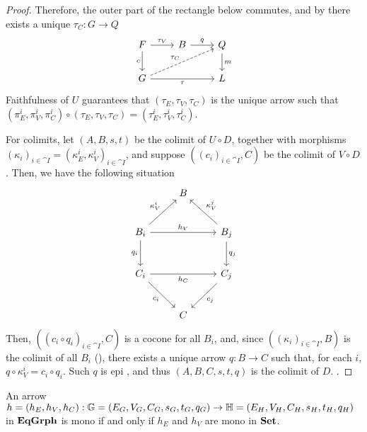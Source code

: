 \begin{proof}
	Therefore, the outer part of the rectangle below commutes, and by  there exists a unique $\tau_C: G \to Q$
    \[
        \begin{tikzcd}
            F \arrow[r, "{\tau_V}"] \arrow[d, "c"swap] & B \arrow[r, "q"] & Q \arrow[d, "m"] \\
            G \arrow[urr, dashed, "{\tau_C}"] \arrow[rr, "{\tau}"swap] & & L
        \end{tikzcd}
    \]
     Faithfulness of $U$ guarantees that $(\tau_E, \tau_V, \tau_C)$ is the unique arrow such that $(\pi_E^i, \pi_V^i, \pi_C^i) \circ (\tau_E, \tau_V, \tau_C) = (\tau_E^i, \tau_V^i, \tau_C^i)$.

     For colimits, let $(A, B, s, t)$ be the colimit of $U \circ D$, together with morphisms $(\kappa_i)_{i \in \cat I} = (\kappa_E^i, \kappa_V^i)_{i \in \cat I}$, and suppose $((c_i)_{i \in \cat I}, C)$ be the colimit of $V \circ D$. Then, we have the following situation
     \[
	     \begin{tikzcd}[row sep = 25, column sep=25]
			& B & \\
			B_i \ar[rr, "{h_V}"] \ar[ur, "{\kappa_V^i}"] \ar[d, "{q_i}"swap] & & B_j \ar[ul, "{\kappa_V^j}"swap] \ar[d, "q_j"] \\
			C_i \ar[rr, "{h_C}" swap] \ar[dr, "{c_i}"swap] & & C_j \ar[dl, "{c_j}"] \\
			& C &
		\end{tikzcd}
     \]
     Then, $((c_i \circ q_i)_{i \in \cat I}, C)$ is a cocone for all $B_i$, and, since $((\kappa_i)_{i \in \cat I}, B)$ is the colimit of all $B_i$ (), there exists a unique arrow $q: B \to C$ such that, for each $i$, $q \circ \kappa_V^i = c_i \circ q_i$. Such $q$ is epi {\color{red}{dimostrare}}, and thus $(A, B, C, s, t, q)$ is the colimit of $D$. {\color{red}{rifinire, dimostrare unicità}}.

\end{proof}

\begin{cor}\label{cor:mono_in_EqGrph}
    An arrow $h = (h_E, h_V, h_C): \mathbb{G} = (E_G, V_G, C_G, s_G, t_G, q_G) \to \mathbb{H} = (E_H, V_H, C_H, s_H, t_H, q_H)$ in $\mathbf{EqGrph}$ is mono if and only if $h_E$ and $h_V$ are mono in $\mathbf{Set}$.
\end{cor}


